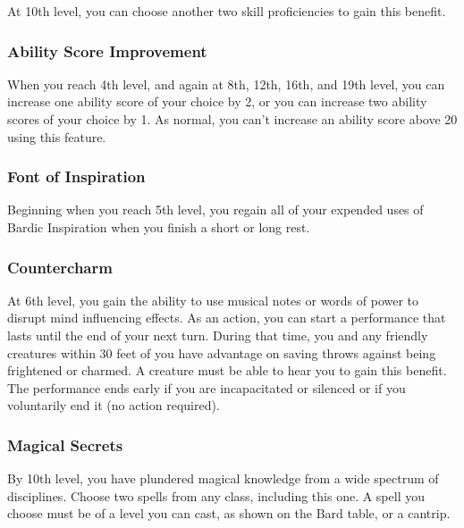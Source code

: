 At 10th level, you can choose another two skill proficiencies to gain
this benefit.

\hypertarget{ability-score-improvement}{%
\subsubsection{Ability Score
Improvement}\label{ability-score-improvement}}

When you reach 4th level, and again at 8th, 12th, 16th, and 19th level,
you can increase one ability score of your choice by 2, or you can
increase two ability scores of your choice by 1. As normal, you can't
increase an ability score above 20 using this feature.

\hypertarget{font-of-inspiration}{%
\subsubsection{Font of Inspiration}\label{font-of-inspiration}}

Beginning when you reach 5th level, you regain all of your expended uses
of Bardic Inspiration when you finish a short or long rest.

\hypertarget{countercharm}{%
\subsubsection{Countercharm}\label{countercharm}}

At 6th level, you gain the ability to use musical notes or words of
power to disrupt mind influencing effects. As an action, you can start a
performance that lasts until the end of your next turn. During that
time, you and any friendly creatures within 30 feet of you have
advantage on saving throws against being frightened or charmed. A
creature must be able to hear you to gain this benefit. The performance
ends early if you are incapacitated or silenced or if you voluntarily
end it (no action required).

\hypertarget{magical-secrets}{%
\subsubsection{Magical Secrets}\label{magical-secrets}}

By 10th level, you have plundered magical knowledge from a wide spectrum
of disciplines. Choose two spells from any class, including this one. A
spell you choose must be of a level you can cast, as shown on the Bard
table, or a cantrip.

